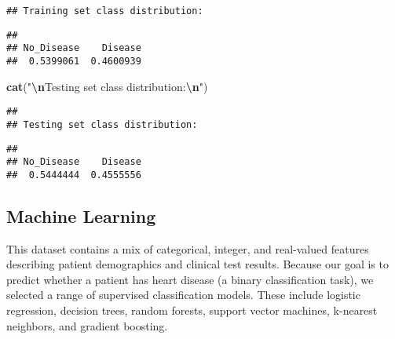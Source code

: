 \documentclass[
]{article}
\newenvironment{Shaded}{\begin{snugshade}}{\end{snugshade}}
\newcommand{\FunctionTok}[1]{\textcolor[rgb]{0.13,0.29,0.53}{\textbf{#1}}}
\newcommand{\NormalTok}[1]{#1}
\newcommand{\SpecialCharTok}[1]{\textcolor[rgb]{0.81,0.36,0.00}{\textbf{#1}}}
\newcommand{\StringTok}[1]{\textcolor[rgb]{0.31,0.60,0.02}{#1}}
\begin{document}
\begin{verbatim}
## Training set class distribution:
\end{verbatim}

\begin{Shaded}
\end{Shaded}

\begin{verbatim}
## 
## No_Disease    Disease 
##  0.5399061  0.4600939
\end{verbatim}

\begin{Shaded}
\begin{Highlighting}[]
\FunctionTok{cat}\NormalTok{(}\StringTok{"}\SpecialCharTok{\textbackslash{}n}\StringTok{Testing set class distribution:}\SpecialCharTok{\textbackslash{}n}\StringTok{"}\NormalTok{)}
\end{Highlighting}
\end{Shaded}

\begin{verbatim}
## 
## Testing set class distribution:
\end{verbatim}

\begin{Shaded}
\end{Shaded}

\begin{verbatim}
## 
## No_Disease    Disease 
##  0.5444444  0.4555556
\end{verbatim}

\subsection{Machine Learning}\label{machine-learning}

This dataset contains a mix of categorical, integer, and real-valued
features describing patient demographics and clinical test results.
Because our goal is to predict whether a patient has heart disease (a
binary classification task), we selected a range of supervised
classification models. These include logistic regression, decision
trees, random forests, support vector machines, k-nearest neighbors, and
gradient boosting.
\end{document}
